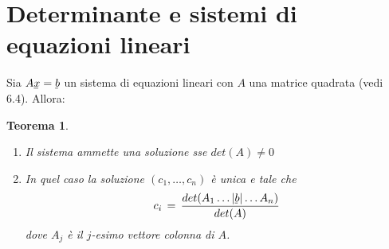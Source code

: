 \documentclass[a4paper]{report}
\newtheorem{teoremaDet}{Teorema}[section]
\theoremstyle{remark}
\theoremstyle{definition}
\newcommand{\uvec}[2][3]{\underline{#2\mkern-#1mu}\mkern#1mu}
\begin{document}
\section{Determinante e sistemi di equazioni lineari}
%
Sia $A\uvec{x}=\uvec{b}$ un sistema di equazioni lineari con $A$ una matrice quadrata (vedi 6.4). Allora:
\begin{shaded}
\begin{teoremaDet}
	\begin{enumerate}
		\item Il sistema ammette una soluzione sse $ det(A)\ne0 $
		\item In quel caso la soluzione $ (c_1,\dots,c_n) $ è unica e tale che 
		\[
		c_i\,=\,\dfrac{det(A_1\dots|\uvec{b}|\dots A_n)}{det(A)}
		\]
		dove $ A_j $ è il $ j $-esimo vettore colonna di $ A $.
	\end{enumerate}
\end{teoremaDet}
\end{shaded}
\end{document}
